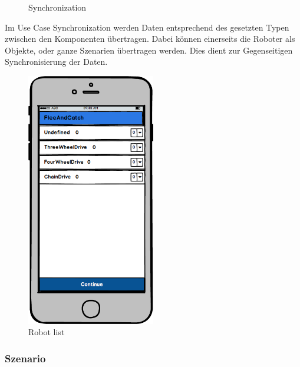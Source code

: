 \begin{figure}[!tbp]
	\centering
	\hfill
	\caption{Synchronization}
\end{figure}

\noindent
Im Use Case Synchronization werden Daten entsprechend des gesetzten Typen zwischen den Komponenten übertragen. Dabei können einerseits die Roboter als Objekte, oder ganze Szenarien übertragen werden. Dies dient zur Gegenseitigen Synchronisierung der Daten.

\begin{figure}[!tbp]
	\begin{center}
		\includegraphics[width=0.5\textwidth]{images/mockups/RobotList.png}
	\end{center}
	\caption{Robot list}
	\label{fig:RobotList}
\end{figure}

\subsubsection{Szenario}

